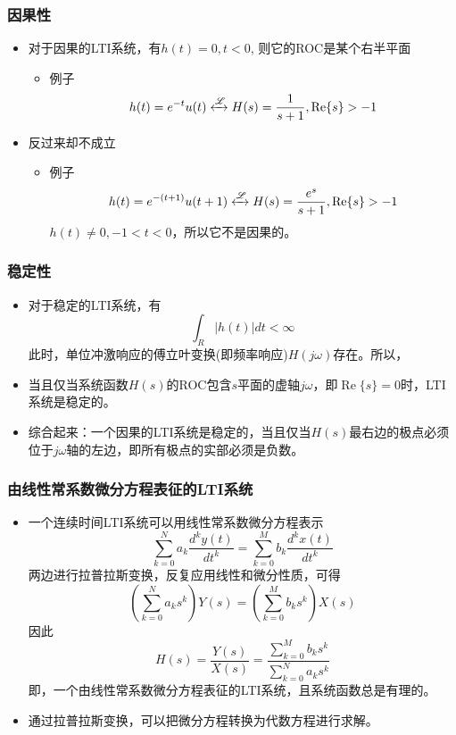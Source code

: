 \documentclass[CJKutf8,dvipsnames,table]{beamer}
\begin{document}
\begin{CJK*}{UTF8}{song}
  \begin{frame}
    \frametitle{因果性}
    \begin{itemize}
    \item 对于因果的LTI系统，有$h(t)=0, t < 0$,
	则它的ROC是某个右半平面
		\begin{itemize}
		\item 例子
		\[
			h(t) = e^{-t}u(t) \xleftrightarrow{\mathscr{L}} H(s) = \frac{1}{s+1}, \operatorname{Re}\{s\} > -1
		\]
		\end{itemize}
	\item 反过来却不成立
		\begin{itemize}
		\item 例子
		\[
			h(t) = e^{-(t+1)}u(t+1) \xleftrightarrow{\mathscr{L}} H(s) = \frac{e^s}{s+1}, \operatorname{Re}\{s\} > -1
		\]
		$h(t) \neq 0, -1 < t < 0$，所以它不是因果的。
		\end{itemize}
	
    \end{itemize}
  \end{frame}   
    
  \begin{frame}
    \frametitle{稳定性}
    \begin{itemize}
    \item 对于稳定的LTI系统，有
    \[
    	\int_R |h(t)|dt < \infty
    \]
    此时，单位冲激响应的傅立叶变换(即频率响应)$H(j\omega)$存在。所以，
    \item 当且仅当系统函数$H(s)$的ROC包含$s$平面的虚轴$j\omega$，即$\operatorname{Re}\{s\}=0$时，LTI系统是稳定的。
	\item 综合起来：一个因果的LTI系统是稳定的，当且仅当$H(s)$最右边的极点必须位于$j\omega$轴的左边，即所有极点的实部必须是负数。
	
    \end{itemize}
  \end{frame}   
      
  \begin{frame}
    \frametitle{由线性常系数微分方程表征的LTI系统}
    \begin{itemize}
    \item 一个连续时间LTI系统可以用线性常系数微分方程表示
    \[
    	\sum_{k=0}^{N} a_k \frac{d^k y(t)}{dt^k} = \sum_{k=0}^{M} b_k \frac{d^k x(t)}{dt^k}
    \]
    两边进行拉普拉斯变换，反复应用线性和微分性质，可得
    \[
    	(\sum_{k=0}^{N} a_k s^k)Y(s)  = (\sum_{k=0}^{M} b_k s^k ) X(s)
    \]
    因此
    \[
    	H(s) = \frac{Y(s)}{X(s)} = \frac{\sum_{k=0}^{M} b_k s^k}{\sum_{k=0}^{N} a_k s^k}    
    \]
    即，一个由线性常系数微分方程表征的LTI系统，且系统函数总是有理的。
    \item 通过拉普拉斯变换，可以把微分方程转换为代数方程进行求解。
    \end{itemize}
  \end{frame}    
  

\end{CJK*}
\end{document}

